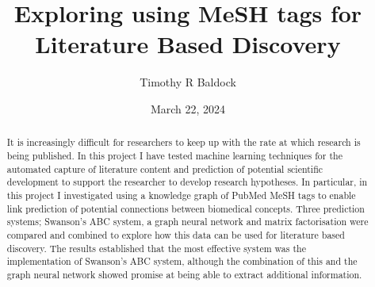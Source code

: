 \documentclass{l4proj}
\begin{document}
\title{Exploring using MeSH tags for Literature Based Discovery}
\author{Timothy R Baldock}
\date{March 22, 2024}

\maketitle

\begin{abstract}
    
    It is increasingly difficult for researchers to keep up with the rate at which research is being published. In this project I have tested  machine learning techniques for the automated capture of literature content and prediction of potential scientific development to support the researcher to develop research hypotheses. In particular, in this project I investigated using a knowledge graph of PubMed MeSH tags to enable link prediction of potential connections between biomedical concepts. Three prediction systems; Swanson's ABC system, a graph neural network and matrix factorisation were compared and combined to explore how this data can be used for literature based discovery. The results established that the most effective  system was the implementation of Swanson's ABC system, although the combination of this and the graph neural network showed promise at being able to extract additional information. 

\end{abstract}



%
%
\def\consentname {Timothy R Baldock} %
\def\consentdate {22 March 2024} %
%
\educationalconsent


\tableofcontents
\end{document}
